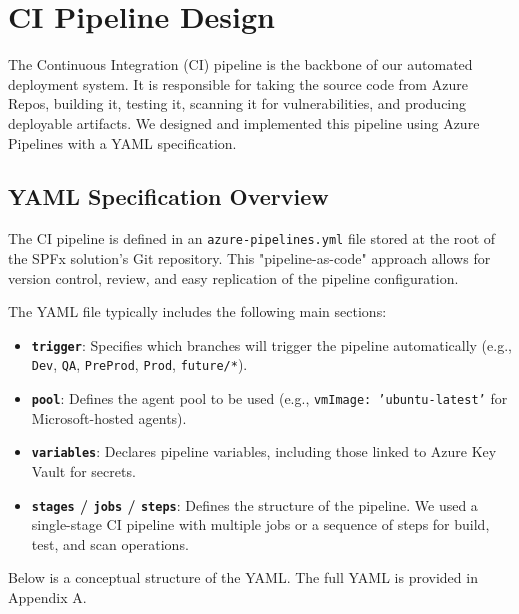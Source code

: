 \chapter{CI Pipeline Design}
\label{chapter:CIPipelineDesign}

The Continuous Integration (CI) pipeline is the backbone of our automated deployment system. It is responsible for taking the source code from Azure Repos, building it, testing it, scanning it for vulnerabilities, and producing deployable artifacts. We designed and implemented this pipeline using Azure Pipelines with a YAML specification.

\section{YAML Specification Overview}
\label{sec:YAMLOverview}

The CI pipeline is defined in an \texttt{azure-pipelines.yml} file stored at the root of the SPFx solution's Git repository. This "pipeline-as-code" approach allows for version control, review, and easy replication of the pipeline configuration.

The YAML file typically includes the following main sections:
\begin{itemize}
    \item \textbf{\texttt{trigger}}: Specifies which branches will trigger the pipeline automatically (e.g., \texttt{Dev}, \texttt{QA}, \texttt{PreProd}, \texttt{Prod}, \texttt{future/*}).
    \item \textbf{\texttt{pool}}: Defines the agent pool to be used (e.g., \texttt{vmImage: 'ubuntu-latest'} for Microsoft-hosted agents).
    \item \textbf{\texttt{variables}}: Declares pipeline variables, including those linked to Azure Key Vault for secrets.
    \item \textbf{\texttt{stages} / \texttt{jobs} / \texttt{steps}}: Defines the structure of the pipeline. We used a single-stage CI pipeline with multiple jobs or a sequence of steps for build, test, and scan operations.
\end{itemize}

Below is a conceptual structure of the YAML. The full YAML is provided in Appendix A.

